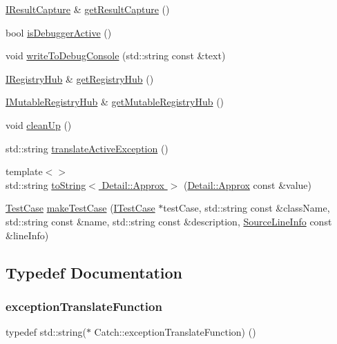 \begin{DoxyCompactItemize}
\item 
\hyperlink{struct_catch_1_1_i_result_capture}{I\+Result\+Capture} \& \hyperlink{namespace_catch_aff60c1de6ac6cea30175d70e33d83c8e}{get\+Result\+Capture} ()
\item 
bool \hyperlink{namespace_catch_ab079497368fb1df25af39ad494d2a241}{is\+Debugger\+Active} ()
\item 
void \hyperlink{namespace_catch_aa5dcf4750ce9a854f4b74d3c952d13cc}{write\+To\+Debug\+Console} (std\+::string const \&text)
\item 
\hyperlink{struct_catch_1_1_i_registry_hub}{I\+Registry\+Hub} \& \hyperlink{namespace_catch_ac24b072979540bfd922e7d46e899f46f}{get\+Registry\+Hub} ()
\item 
\hyperlink{struct_catch_1_1_i_mutable_registry_hub}{I\+Mutable\+Registry\+Hub} \& \hyperlink{namespace_catch_ac9ddcc6d66079add9cb2a3140b8ae51e}{get\+Mutable\+Registry\+Hub} ()
\item 
void \hyperlink{namespace_catch_a0f78e9afdebc6d4512d18e76fbf54b8c}{clean\+Up} ()
\item 
std\+::string \hyperlink{namespace_catch_adafff91485eeeeb9e9333f317cc0e3b1}{translate\+Active\+Exception} ()
\item 
{\footnotesize template$<$$>$ }\\std\+::string \hyperlink{namespace_catch_ac501c2b6bfe82978d699ddda37c53d13}{to\+String$<$ Detail\+::\+Approx $>$} (\hyperlink{class_catch_1_1_detail_1_1_approx}{Detail\+::\+Approx} const \&value)
\item 
\hyperlink{class_catch_1_1_test_case}{Test\+Case} \hyperlink{namespace_catch_a2a784590bb5068810d3f6013fed1f1d3}{make\+Test\+Case} (\hyperlink{struct_catch_1_1_i_test_case}{I\+Test\+Case} $\ast$test\+Case, std\+::string const \&class\+Name, std\+::string const \&name, std\+::string const \&description, \hyperlink{struct_catch_1_1_source_line_info}{Source\+Line\+Info} const \&line\+Info)
\end{DoxyCompactItemize}


\subsection{Typedef Documentation}
\hypertarget{namespace_catch_a14edb319150d3e108bbdef994f9eec2a}{}\label{namespace_catch_a14edb319150d3e108bbdef994f9eec2a} 
\subsubsection{\texorpdfstring{exception\+Translate\+Function}{exceptionTranslateFunction}}
{\footnotesize\ttfamily typedef std\+::string($\ast$ Catch\+::exception\+Translate\+Function) ()}



